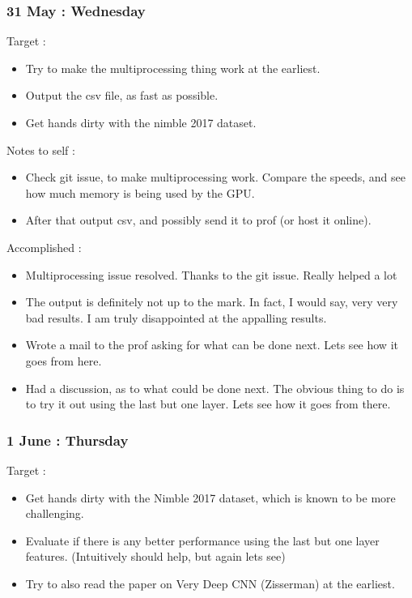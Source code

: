 \documentclass{article}
\begin{document}
\subsubsection{31 May : Wednesday}
Target :
\begin{itemize}
\item Try to make the multiprocessing thing work at the earliest.
\item Output the csv file, as fast as possible.
\item Get hands dirty with the nimble 2017 dataset.
\end{itemize}

Notes to self :
\begin{itemize}
\item Check git issue, to make multiprocessing work. Compare the speeds, and see how much memory is being used by the GPU.
\item After that output csv, and possibly send it to prof (or host it online).
\end{itemize}

Accomplished :
\begin{itemize}
\item Multiprocessing issue resolved. Thanks to the git issue. Really helped a lot
\item The output is definitely not up to the mark. In fact, I would say, very very bad results. I am truly disappointed at the appalling results.
\item Wrote a mail to the prof asking for what can be done next. Lets see how it goes from here.
\item Had a discussion, as to what could be done next. The obvious thing to do is to try it out using the last but one layer. Lets see how it goes from there.
\end{itemize}

\subsubsection{1 June : Thursday}
Target :
\begin{itemize}
\item Get hands dirty with the Nimble 2017 dataset, which is known to be more challenging.
\item Evaluate if there is any better performance using the last but one layer features. (Intuitively should help, but again lets see)
\item Try to also read the paper on Very Deep CNN (Zisserman) at the earliest.
\end{itemize}
\end{document}
